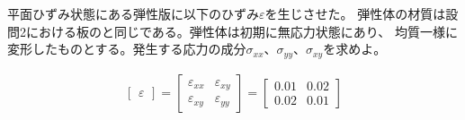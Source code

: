 平面ひずみ状態にある弾性版に以下のひずみ$\varepsilon$を生じさせた。
弾性体の材質は設問2における板のと同じである。弾性体は初期に無応力状態にあり、
均質一様に変形したものとする。発生する応力の成分$\sigma_{xx}$、$\sigma_{yy}$、$\sigma_{xy}$を求めよ。

\begin{align*}%
  \begin{bmatrix}
    \varepsilon
  \end{bmatrix}
  =
  \begin{bmatrix}
    \varepsilon_{xx}&\varepsilon_{xy}\\
    \varepsilon_{xy}&\varepsilon_{yy}
  \end{bmatrix}
  =
  \begin{bmatrix}
    0.01&0.02\\
    0.02&0.01
  \end{bmatrix}
\end{align*}


